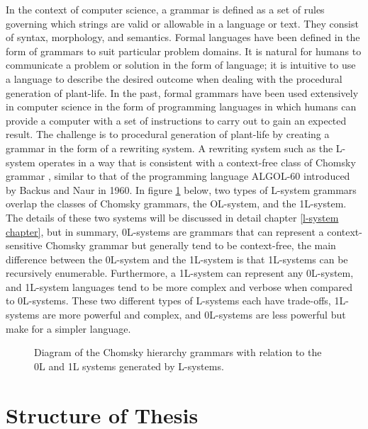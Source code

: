 In the context of computer science, a grammar is defined as a set of rules governing which strings are valid or allowable in a language or text. They consist of syntax, morphology, and semantics. Formal languages have been defined in the form of grammars to suit particular problem domains. It is natural for humans to communicate a problem or solution in the form of language; it is intuitive to use a language to describe the desired outcome when dealing with the procedural generation of plant-life. In the past, formal grammars have been used extensively in computer science in the form of programming languages in which humans can provide a computer with a set of instructions to carry out to gain an expected result. The challenge is to procedural generation of plant-life by creating a  grammar in the form of a rewriting system. A rewriting system such as the L-system operates in a way that is consistent with a context-free class of Chomsky grammar \cite{chomsky1956three}, similar to that of the programming language ALGOL-60 introduced by Backus and Naur in  1960\cite{backus1960report}. In figure \ref{chomsky grammars} below, two types of L-system grammars overlap the classes of Chomsky grammars, the OL-system, and the 1L-system. The details of these two systems will be discussed in detail chapter \ref{l-system chapter}, but in summary, 0L-systems are grammars that can represent a context-sensitive Chomsky grammar but generally tend to be context-free, the main difference between the 0L-system and the 1L-system is that 1L-systems can be recursively enumerable. Furthermore, a 1L-system can represent any 0L-system, and 1L-system languages tend to be more complex and verbose when compared to 0L-systems. These two different types of L-systems each have trade-offs, 1L-systems are more powerful and complex, and 0L-systems are less powerful but make for a simpler language. 

\begin{figure}[htbp]
	{\centering
		\setlength{\fboxrule}{1pt}
		\vspace{7px}
		\caption{Diagram of the Chomsky hierarchy grammars with relation to the 0L and 1L systems generated by L-systems.} \label{chomsky grammars}
	}
\end{figure}
\FloatBarrier

\section{Structure of Thesis}

